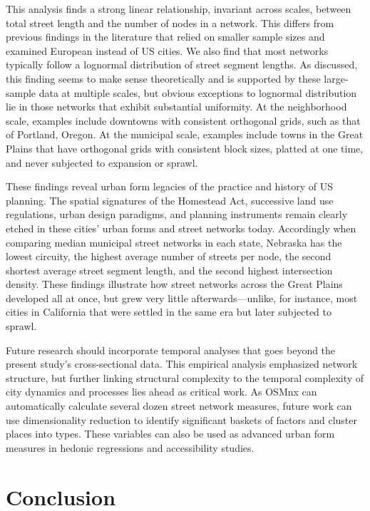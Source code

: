 \documentclass[Afour,sageh,times]{sagej}
\begin{document}
This analysis finds a strong linear relationship, invariant across scales, between total street length and the number of nodes in a network. This differs from previous findings in the literature that relied on smaller sample sizes and examined European instead of US cities. We also find that most networks typically follow a lognormal distribution of street segment lengths. As discussed, this finding seems to make sense theoretically and is supported by these large-sample data at multiple scales, but obvious exceptions to lognormal distribution lie in those networks that exhibit substantial uniformity. At the neighborhood scale, examples include downtowns with consistent orthogonal grids, such as that of Portland, Oregon. At the municipal scale, examples include towns in the Great Plains that have orthogonal grids with consistent block sizes, platted at one time, and never subjected to expansion or sprawl.

These findings reveal urban form legacies of the practice and history of US planning. The spatial signatures of the Homestead Act, successive land use regulations, urban design paradigms, and planning instruments remain clearly etched in these cities' urban forms and street networks today. Accordingly when comparing median municipal street networks in each state, Nebraska has the lowest circuity, the highest average number of streets per node, the second shortest average street segment length, and the second highest intersection density. These findings illustrate how street networks across the Great Plains developed all at once, but grew very little afterwards---unlike, for instance, most cities in California that were settled in the same era but later subjected to sprawl.

Future research should incorporate temporal analyses that goes beyond the present study's cross-sectional data. This empirical analysis emphasized network structure, but further linking structural complexity to the temporal complexity of city dynamics and processes lies ahead as critical work. As OSMnx can automatically calculate several dozen street network measures, future work can use dimensionality reduction to identify significant baskets of factors and cluster places into types. These variables can also be used as advanced urban form measures in hedonic regressions and accessibility studies.

\section{Conclusion}
\end{document}
